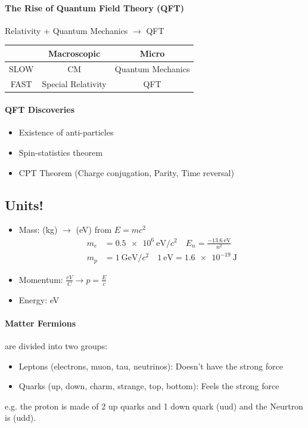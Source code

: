 \documentclass[../main.tex]{subfiles}
\begin{document}
\paragraph{The Rise of Quantum Field Theory (QFT)}

Relativity + Quantum Mechanics $\rightarrow$ QFT

\begin{center}
    \begin{tabular}{c|c|c}
        & Macroscopic & Micro \\
        \hline
        SLOW & CM & Quantum Mechanics \\
        \hline
        FAST & Special Relativity & QFT \\
    \end{tabular}
\end{center}

\paragraph{QFT Discoveries}
\begin{itemize}
    \item Existence of anti-particles
    \item Spin-statistics theorem
    \item CPT Theorem (Charge conjugation, Parity, Time reversal)
\end{itemize}

\subsection*{Units!}
\begin{itemize}
    \item Mass: (kg) $\rightarrow$ (eV) from $E = mc^2$
\begin{align*}
    m_e &= \qty{0.5e6}{\electronvolt/c^2} \quad E_n = \frac{\qty{-13.6}{\electronvolt}}{n^2} \\
    m_p &= \qty{1}{\giga\electronvolt/c^2} \quad \qty{1}{\electronvolt} = \qty{1.6e-19}{\joule}
\end{align*}
    \item Momentum: $\frac{eV}{C} \rightarrow p = \frac{E}{c}$
    \item Energy: eV
\end{itemize}

\paragraph{Matter Fermions} are divided into two groups:
\begin{itemize}
    \item Leptons (electrons, muon, tau, neutrinos): Doesn't have the strong force
    \item Quarks (up, down, charm, strange, top, bottom): Feels the strong force 
\end{itemize}
e.g. the proton is made of 2 up quarks and 1 down quark (uud) and the Neurtron is (udd).
\end{document}
